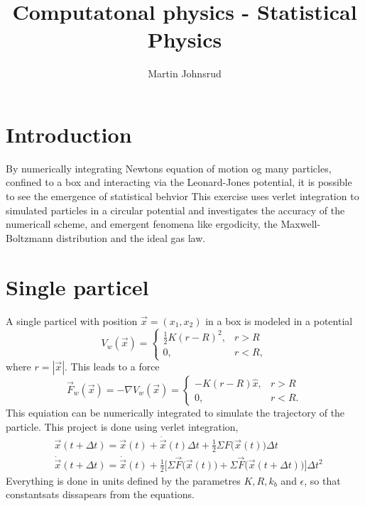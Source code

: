 \documentclass{article}
\title{Computatonal physics - Statistical Physics}
\author{Martin Johnsrud}
\begin{document}
    \vspace{-80pt}
    \maketitle
    
    \section*{Introduction}
    By numerically integrating Newtons equation of motion og many particles, confined to a box and interacting via the Leonard-Jones potential, it is possible to see the emergence of statistical behvior This exercise uses verlet integration to simulated particles in a circular potential and investigates the accuracy of the numericall scheme, and emergent fenomena like ergodicity, the Maxwell-Boltzmann distribution and the ideal gas law.

    \section*{Single particel}
        A single particel with position $\vec x = (x_1, x_2)$ in a box is modeled in a potential 
        \begin{equation*}
            V_w(\vec x) = 
            \begin{cases}
                \frac{1}{2}K(r - R)^2, & r > R \\
                0, & r < R,
            \end{cases}
        \end{equation*}
        where $r = |\vec x|$. This leads to a force 
        \begin{equation*}
            \vec F_w(\vec x) = -\nabla V_w(\vec x) = 
            \begin{cases}
                -K(r - R)\hat x, & r>R \\
                0, & r<R.
            \end{cases}
        \end{equation*}
        This equiation can be numerically integrated to simulate the trajectory of the particle. This project is done using verlet integration, 
        \begin{align*} 
            & \vec x(t + \Delta t) = \vec x(t) + \dot{\vec x}(t) \Delta t + \frac{1}{2} \Sigma F\big(\vec x(t)\big) \Delta t \\
            & \dot{\vec x}(t + \Delta t) = \dot{\vec x}(t) + \frac{1}{2} \Big[\Sigma \vec F\big(\vec x(t)\big) + \Sigma \vec F\big(\vec x(t + \Delta t)\big)\Big] \Delta t^2
        \end{align*}
        Everything is done in units defined by the parametres $K, R, k_b$ and $\epsilon$, so that constantsats dissapears from the equations.
\end{document}

